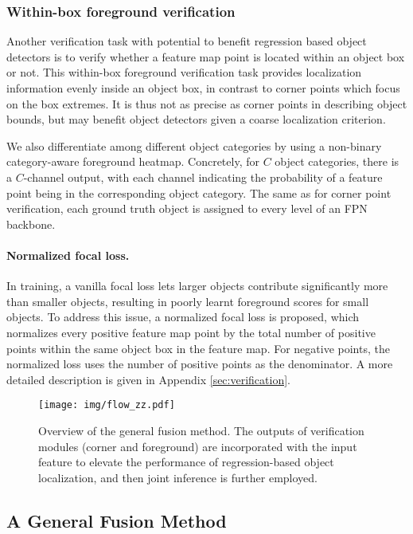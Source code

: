 \documentclass{article}
\begin{document}
\subsubsection{Within-box foreground verification}

Another verification task with potential to benefit regression based object detectors is to verify whether a feature map point is located within an object box or not. This within-box foreground verification task provides localization information evenly inside an object box, in contrast to corner points which focus on the box extremes. It is thus not as precise as corner points in describing object bounds, but may benefit object detectors given a coarse localization criterion. 

We also differentiate among different object categories by using a non-binary category-aware foreground heatmap. Concretely, for $C$ object categories, there is a $C$-channel output, with each channel indicating the probability of a feature point being in the corresponding object category. The same as for corner point verification, each ground truth object is assigned to every level of an FPN backbone.

\paragraph{Normalized focal loss.} In training, a vanilla focal loss lets larger objects contribute significantly more than smaller objects, resulting in poorly learnt foreground scores for small objects. To address this issue, a normalized focal loss is proposed, which normalizes every positive feature map point by the total number of positive points within the same object box in the feature map. For negative points, the normalized loss uses the number of positive points as the denominator. A more detailed description is given in Appendix \ref{sec:verification}.

\begin{figure}
    \centering
    \texttt{[image: img/flow\_zz.pdf]}
    \caption{Overview of the general fusion method. The outputs of verification modules (corner and foreground) are incorporated with the input feature to elevate the performance of regression-based object localization, and then joint inference is further employed.}
    \label{fig:flow1}
    \vspace{-1em}
\end{figure}

\subsection{A General Fusion Method} \label{sec:fusion}
\end{document}
